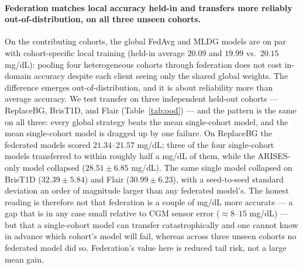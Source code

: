 \documentclass[10pt,letterpaper]{article}
\begin{document}
\paragraph{Federation matches local accuracy held-in and transfers more reliably
out-of-distribution, on all three unseen cohorts.} On the contributing cohorts,
the global FedAvg and MLDG models are on par with cohort-specific local training
(held-in average $20.09$ and $19.99$ vs.\ $20.15$ mg/dL): pooling four
heterogeneous cohorts through federation does not cost in-domain accuracy despite
each client seeing only the shared global weights. The difference emerges
out-of-distribution, and it is about reliability more than average accuracy. We
test transfer on three independent held-out cohorts --- ReplaceBG, BrisT1D, and
Flair (Table~\ref{tab:ood}) --- and the pattern is the same on all three: every
global strategy beats the mean single-cohort model, and the mean single-cohort
model is dragged up by one failure. On ReplaceBG the federated models scored
$21.34$--$21.57$ mg/dL; three of the four single-cohort models transferred to
within roughly half a mg/dL of them, while the ARISES-only model collapsed
($28.51 \pm 6.85$ mg/dL). The same single model collapsed on BrisT1D
($32.39 \pm 5.84$) and Flair ($30.99 \pm 6.23$), with a seed-to-seed standard
deviation an order of magnitude larger than any federated model's. The honest
reading is therefore not that federation is a couple of mg/dL more accurate ---
a gap that is in any case small relative to CGM sensor error
($\approx 8$--$15$ mg/dL) --- but that a single-cohort model can transfer
catastrophically and one cannot know in advance which cohort's model will fail,
whereas across three unseen cohorts no federated model did so. Federation's value
here is reduced tail risk, not a large mean gain.
\end{document}
